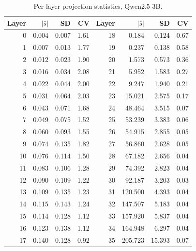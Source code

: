 \begin{table}[t]
  \centering
  \small
  \caption{Per-layer projection statistics, Qwen2.5-3B.}
  \label{tab:cv_qwen3b}
  \begin{tabular}{rrrr@{\hskip 2em}rrrr}
    \toprule
    Layer & $|\bar s|$ & SD & CV & Layer & $|\bar s|$ & SD & CV \\
    \midrule
    0 & 0.004 & 0.007 & 1.61 & 18 & 0.184 & 0.124 & 0.67 \\
    1 & 0.007 & 0.013 & 1.77 & 19 & 0.237 & 0.138 & 0.58 \\
    2 & 0.012 & 0.023 & 1.90 & 20 & 1.573 & 0.573 & 0.36 \\
    3 & 0.016 & 0.034 & 2.08 & 21 & 5.952 & 1.583 & 0.27 \\
    4 & 0.022 & 0.044 & 2.00 & 22 & 9.247 & 1.940 & 0.21 \\
    5 & 0.031 & 0.064 & 2.03 & 23 & 15.021 & 2.575 & 0.17 \\
    6 & 0.043 & 0.071 & 1.68 & 24 & 48.464 & 3.515 & 0.07 \\
    7 & 0.049 & 0.075 & 1.52 & 25 & 53.239 & 3.383 & 0.06 \\
    8 & 0.060 & 0.093 & 1.55 & 26 & 54.915 & 2.855 & 0.05 \\
    9 & 0.074 & 0.135 & 1.82 & 27 & 56.860 & 2.628 & 0.05 \\
    10 & 0.076 & 0.114 & 1.50 & 28 & 67.182 & 2.656 & 0.04 \\
    11 & 0.083 & 0.106 & 1.28 & 29 & 74.392 & 2.823 & 0.04 \\
    12 & 0.090 & 0.109 & 1.22 & 30 & 92.187 & 3.203 & 0.03 \\
    13 & 0.109 & 0.135 & 1.23 & 31 & 120.500 & 4.393 & 0.04 \\
    14 & 0.115 & 0.143 & 1.24 & 32 & 147.507 & 5.183 & 0.04 \\
    15 & 0.114 & 0.128 & 1.12 & 33 & 157.920 & 5.837 & 0.04 \\
    16 & 0.123 & 0.138 & 1.12 & 34 & 164.948 & 6.297 & 0.04 \\
    17 & 0.140 & 0.128 & 0.92 & 35 & 205.723 & 15.393 & 0.07 \\
    \bottomrule
  \end{tabular}
\end{table}


